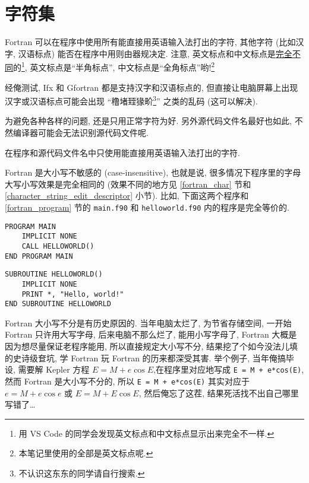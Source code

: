 \section{字符集}

Fortran 可以在程序中使用所有能直接用英语输入法打出的字符, 其他字符 (比如汉字, 汉语标点) 能否在程序中用则由器规决定. 注意, 英文标点和中文标点是\uline{完全不同}的\footnote{用 VS Code 的同学会发现英文标点和中文标点显示出来完全不一样.}, 英文标点是``半角标点'', 中文标点是``全角标点''哟!\footnote{本笔记里使用的全部是英文标点呢.}

经俺测试, Ifx 和 Gfortran 都是支持汉字和汉语标点的, 但直接让电脑屏幕上出现汉字或汉语标点可能会出现 ``穞堵臸猭畍\footnote{不认识这东东的同学请自行搜索.}'' 之类的乱码 (这可以解决).

为避免各种各样的问题, 还是只用正常字符为好. 另外源代码文件名最好也如此, 不然编译器可能会无法识别源代码文件呢.
\begin{convention}
    在程序和源代码文件名中只使用能直接用英语输入法打出的字符.\label{english_character_convention}
\end{convention}

Fortran 是大小写不敏感的 (case-insensitive), 也就是说, 很多情况下程序里的字母大写小写效果是完全相同的 (效果不同的地方见 \ref{fortran_char} 节和 \ref{character_string_edit_descriptor} 小节). 比如, 下面这两个程序和 \ref{fortran_program} 节的 \texttt{main.f90} 和 \texttt{helloworld.f90} 内的程序是完全等价的.
\begin{lstlisting}
PROGRAM MAIN
    IMPLICIT NONE
    CALL HELLOWORLD()
END PROGRAM MAIN
\end{lstlisting}
\begin{lstlisting}
SUBROUTINE HELLOWORLD()
    IMPLICIT NONE
    PRINT *, "Hello, world!"
END SUBROUTINE HELLOWORLD
\end{lstlisting}

Fortran 大小写不分是有历史原因的. 当年电脑太烂了, 为节省存储空间, 一开始 Fortran 只许用大写字母, 后来电脑不那么烂了, 能用小写字母了, Fortran 大概是因为想尽量保证老程序能用, 所以直接规定大小写不分, 结果挖了个如今没法儿填的史诗级奆坑, 学 Fortran 玩 Fortran 的历来都深受其害. 举个例子, 当年俺搞毕设, 需要解 Kepler 方程 $E=M+e\cos E$,在程序里对应地写成 \texttt{E = M + e*cos(E)}, 然而 Fortran 是大小写不分的, 所以 \texttt{E = M + e*cos(E)} 其实对应于 $e=M+e\cos e$ 或 $E=M+E\cos E$, 然后俺忘了这茬, 结果死活找不出自己哪里写错了\dots{}

